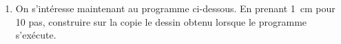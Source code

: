 \documentclass[exercice,a4]{thedocument}%
\begin{document}
\bigskip

\begin{enumerate}[start=3]
\item On s'intéresse maintenant au programme ci-dessous. En prenant 1~cm pour 10 pas, construire sur la copie le dessin obtenu lorsque le programme s'exécute.
\end{enumerate}

\begin{center}
\begin{scratch}[scale=0.8]
{
}
\end{scratch}
\end{center}
\showthesource
\end{document}
